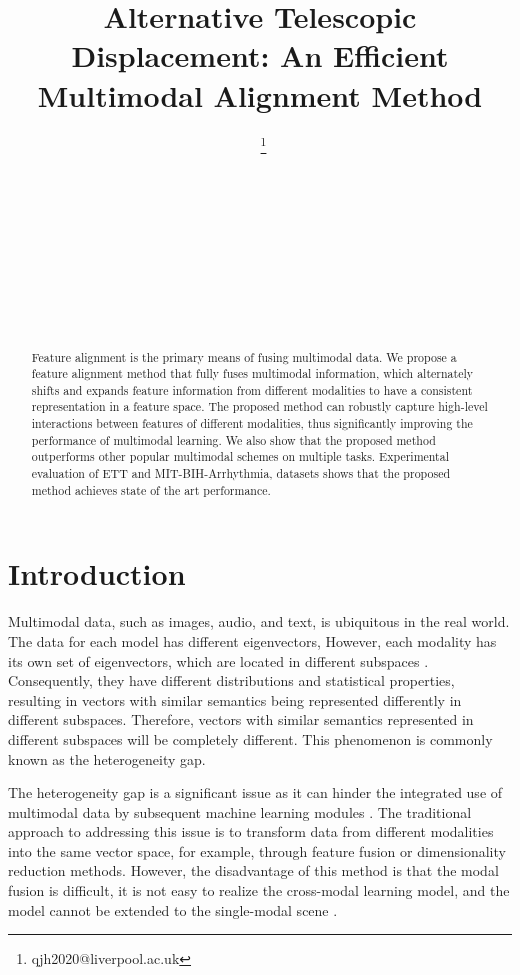 \documentclass{ecai}
\begin{document}
\begin{frontmatter}

\title{Alternative Telescopic Displacement: An Efficient Multimodal Alignment Method}

\author[A]{\fnms{}~\thanks{qjh2020@liverpool.ac.uk}}
\author[A]{\fnms{}~}
\author[A]{\fnms{}~}
\author[A]{\fnms{}~}
\author[A]{\fnms{}~}
\author[A]{\fnms{}~}





\address[A]{Xi’an Jiaotong-Liverpool University}


\begin{abstract}
Feature alignment is the primary means of fusing multimodal data. We propose a feature alignment method that fully fuses multimodal information, which alternately shifts and expands feature information from different modalities to have a consistent representation in a feature space. The proposed method can robustly capture high-level interactions between features of different modalities, thus significantly improving the performance of multimodal learning. We also show that the proposed method outperforms other popular multimodal schemes on multiple tasks. Experimental evaluation of ETT and MIT-BIH-Arrhythmia, datasets shows that the proposed method achieves state of the art performance.
\end{abstract}

\end{frontmatter}

\section{Introduction}
Multimodal data, such as images, audio, and text, is ubiquitous in the real world. The data for each model has different eigenvectors, However, each modality has its own set of eigenvectors, which are located in different subspaces \cite{lahat_multimodal_2015}. Consequently, they have different distributions and statistical properties, resulting in vectors with similar semantics being represented differently in different subspaces. Therefore, vectors with similar semantics represented in different subspaces will be completely different. This phenomenon is commonly known as the heterogeneity gap.

The heterogeneity gap is a significant issue as it can hinder the integrated use of multimodal data by subsequent machine learning modules \cite{lahat_multimodal_2015}. The traditional approach to addressing this issue is to transform data from different modalities into the same vector space, for example, through feature fusion or dimensionality reduction methods. 
 However, the disadvantage of this method is that the modal fusion is difficult, it is not easy to realize the cross-modal learning model, and the model cannot be extended to the single-modal scene \cite{cho_unifying_2021}.
\end{document}
